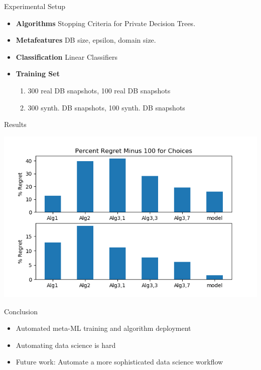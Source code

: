 \documentclass{beamer}
\begin{document}
\begin{frame}{Experimental Setup}
\begin{itemize}
\item \textbf{Algorithms} Stopping Criteria for Private Decision Trees.
\item \textbf{Metafeatures} DB size, epsilon, domain size.
\item \textbf{Classification} Linear Classifiers
\item \textbf{Training Set} 
\begin{enumerate}
\item 300 real DB snapshots, 100 real DB snapshots
\item 300 synth. DB snapshots, 100 synth. DB snapshots
\end{enumerate}
\end{itemize}
\end{frame}

\begin{frame}{Results}
\begin{center}
\includegraphics[scale=0.6]{Results}
\end{center}
\end{frame}

\begin{frame}{Conclusion}
\begin{itemize}
\item Automated meta-ML training and algorithm deployment
\item Automating data science is hard
\item Future work: Automate a more sophisticated data science workflow
\end{itemize}

\end{frame}
\end{document}
